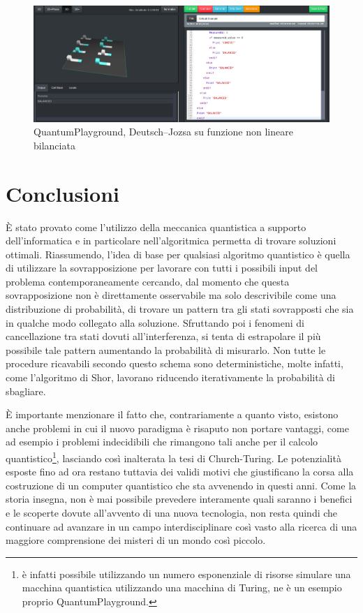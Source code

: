 \documentclass[12pt,a4paper,openright]{report}
\begin{document}
\begin{figure}[!h]
    
            \includegraphics[width=.92\textwidth,height=\textheight,keepaspectratio]{nonLinearBalancedFunction}
            \caption{QuantumPlayground, Deutsch–Jozsa su funzione non lineare bilanciata}
        
\end{figure}

\chapter{Conclusioni}
È stato provato come l'utilizzo della meccanica quantistica a supporto dell'informatica e in particolare nell'algoritmica permetta di trovare soluzioni ottimali.
Riassumendo, l'idea di base per qualsiasi algoritmo quantistico è quella di utilizzare la sovrapposizione per lavorare con tutti i possibili input
del problema contemporaneamente cercando, dal momento che questa sovrapposizione non è direttamente osservabile ma solo descrivibile come una distribuzione di 
probabilità, di trovare un pattern tra gli stati sovrapposti che sia in qualche modo collegato alla soluzione. Sfruttando poi i fenomeni di cancellazione tra stati
dovuti all'interferenza, si tenta di estrapolare il più possibile tale pattern aumentando la probabilità di misurarlo. Non tutte le procedure ricavabili secondo
questo schema sono deterministiche, molte infatti, come l'algoritmo di Shor, lavorano riducendo iterativamente la probabilità di sbagliare.\par
È importante menzionare il fatto che, contrariamente a quanto visto, esistono anche problemi in cui il nuovo paradigma è risaputo non portare vantaggi, 
come ad esempio i problemi indecidibili che rimangono tali anche per il calcolo quantistico\footnote{è infatti possibile
utilizzando un numero esponenziale di risorse simulare una macchina quantistica utilizzando una macchina di Turing, ne è un esempio proprio QuantumPlayground.}, lasciando così inalterata la tesi di Church-Turing.
Le potenzialità esposte fino ad ora restano tuttavia dei validi motivi che giustificano la corsa alla costruzione di un computer quantistico
che sta avvenendo in questi anni. Come la storia insegna, non è mai possibile prevedere interamente quali saranno i benefici e le scoperte dovute all'avvento di una nuova tecnologia,
non resta quindi che continuare ad avanzare in un campo interdisciplinare così vasto alla ricerca di una maggiore comprensione dei misteri di un mondo così piccolo.
\end{document}
